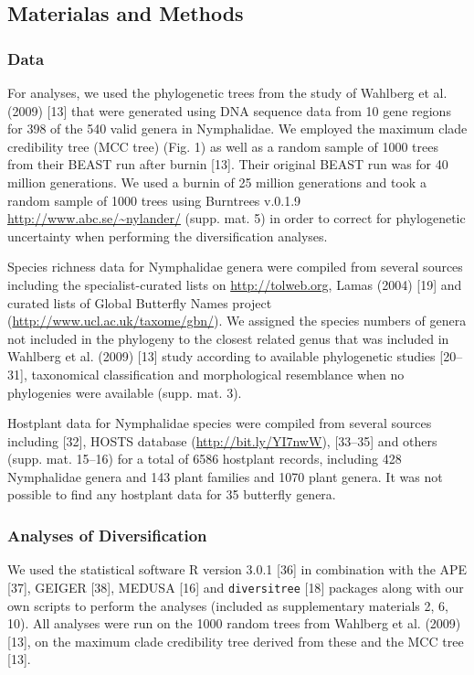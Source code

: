 \documentclass[10pt]{article}
\begin{document}
\subsection*{Materialas and Methods}

\subsubsection*{Data}

For analyses, we used the phylogenetic trees from the study of Wahlberg
et al. (2009) {[}13{]} that were generated using DNA sequence data from
10 gene regions for 398 of the 540 valid genera in Nymphalidae. We
employed the maximum clade credibility tree (MCC tree) (Fig. 1) as well
as a random sample of 1000 trees from their BEAST run after burnin
{[}13{]}. Their original BEAST run was for 40 million generations. We
used a burnin of 25 million generations and took a random sample of 1000
trees using Burntrees v.0.1.9 \url{http://www.abc.se/~nylander/} (supp.
mat. 5) in order to correct for phylogenetic uncertainty when performing
the diversification analyses.

Species richness data for Nymphalidae genera were compiled from several
sources including the specialist-curated lists on
\url{http://tolweb.org}, Lamas (2004) {[}19{]} and curated lists of
Global Butterfly Names project (\url{http://www.ucl.ac.uk/taxome/gbn/}).
We assigned the species numbers of genera not included in the phylogeny
to the closest related genus that was included in Wahlberg et al. (2009)
{[}13{]} study according to available phylogenetic studies {[}20--31{]},
taxonomical classification and morphological resemblance when no
phylogenies were available (supp. mat. 3).

Hostplant data for Nymphalidae species were compiled from several
sources including {[}32{]}, HOSTS database (\url{http://bit.ly/YI7nwW}),
{[}33--35{]} and others (supp. mat. 15--16) for a total of 6586
hostplant records, including 428 Nymphalidae genera and 143 plant
families and 1070 plant genera. It was not possible to find any
hostplant data for 35 butterfly genera.

\subsubsection*{Analyses of
Diversification}

We used the statistical software R version 3.0.1 {[}36{]} in combination
with the APE {[}37{]}, GEIGER {[}38{]}, MEDUSA {[}16{]} and
\texttt{diversitree} {[}18{]} packages along with our own scripts to
perform the analyses (included as supplementary materials 2, 6, 10). All
analyses were run on the 1000 random trees from Wahlberg et al. (2009)
{[}13{]}, on the maximum clade credibility tree derived from these and
the MCC tree {[}13{]}.
\end{document}
